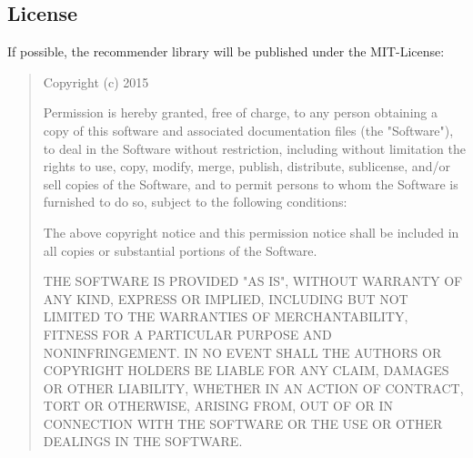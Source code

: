 \FloatBarrier

\subsection{License}
If possible, the recommender library will be published under the MIT-License:\\

\begin{quote}
Copyright (c) 2015 \myAuthor

Permission is hereby granted, free of charge, to any person obtaining a copy of this software and associated documentation files (the "Software"), to deal in the Software without restriction, including without limitation the rights to use, copy, modify, merge, publish, distribute, sublicense, and/or sell copies of the Software, and to permit persons to whom the Software is furnished to do so, subject to the following conditions:

The above copyright notice and this permission notice shall be included in all copies or substantial portions of the Software.

THE SOFTWARE IS PROVIDED "AS IS", WITHOUT WARRANTY OF ANY KIND, EXPRESS OR IMPLIED, INCLUDING BUT NOT LIMITED TO THE WARRANTIES OF MERCHANTABILITY, FITNESS FOR A PARTICULAR PURPOSE AND NONINFRINGEMENT. IN NO EVENT SHALL THE AUTHORS OR COPYRIGHT HOLDERS BE LIABLE FOR ANY CLAIM, DAMAGES OR OTHER LIABILITY, WHETHER IN AN ACTION OF CONTRACT, TORT OR OTHERWISE, ARISING FROM, OUT OF OR IN CONNECTION WITH THE SOFTWARE OR THE USE OR OTHER DEALINGS IN THE SOFTWARE.
\end{quote}




